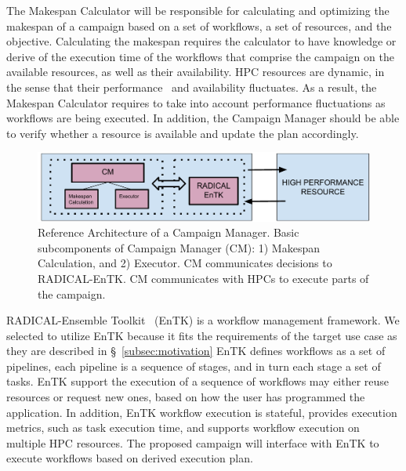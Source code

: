 The Makespan Calculator will be responsible for calculating and optimizing the makespan of a campaign based on a set of workflows, a set of resources, and the objective.
Calculating the makespan requires the calculator to have knowledge or derive of the execution time of the workflows that comprise the campaign on the available resources, as well as their availability.
HPC resources are dynamic, in the sense that their performance~\cite{pouchard2019computational} and availability fluctuates.
As a result, the Makespan Calculator requires to take into account performance fluctuations as workflows are being executed.
In addition, the Campaign Manager should be able to verify whether a resource is available and update the plan accordingly.


\begin{figure}[t]
    \centering
    \includegraphics[width=.95\textwidth]{figures/CEM_RefArch.pdf}
    \caption{Reference Architecture of a Campaign Manager. Basic 
    subcomponents of Campaign Manager (CM): 1) Makespan Calculation, and 2) Executor. 
    CM communicates decisions to RADICAL-EnTK. CM communicates with HPCs to 
    execute parts of the campaign.}\label{fig:refarch}
\end{figure}

RADICAL-Ensemble Toolkit~\cite{balasubramanian2018harnessing} (EnTK) is a workflow management framework.
We selected to utilize EnTK because it fits the requirements of the target use case as they are described in \S~\ref{subsec:motivation}
EnTK defines workflows as a set of pipelines, each pipeline is a sequence of stages, and in turn each stage a set of tasks.
EnTK support the execution of a sequence of workflows may either reuse resources or request new ones, based on how the user has programmed the application.
In addition, EnTK workflow execution is stateful, provides execution metrics, such as task execution time, and supports workflow execution on multiple HPC resources.
The proposed campaign will interface with EnTK to execute workflows based on derived execution plan.


